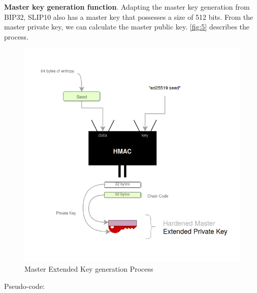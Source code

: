 \bigskip
{\textbf{Master key generation function}}. Adapting the master key generation from BIP32, SLIP10 also has a master key that possesses a size of 512 bits. From the master private key, we can calculate the master public key.
\autoref{fig:5} describes the process.

\bigskip
\begin{figure}[ht!]
    \centering
    \includegraphics[width=1\textwidth]{images/master_slip10.png}
    \caption[Master Extended Key generation Process]{Master Extended Key generation Process}
    \label{fig:5}
\end{figure}

Pseudo-code:

